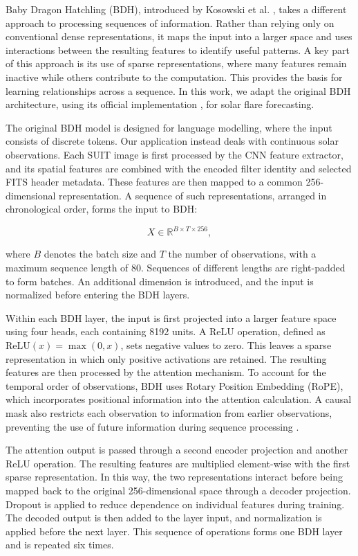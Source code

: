 \documentclass[oneside]{ieeeaccess}
\begin{document}
Baby Dragon Hatchling (BDH), introduced by Kosowski et al. 
\cite{ref3}, takes a different approach to processing 
sequences of information. Rather than relying only on 
conventional dense representations, it maps the input into 
a larger space and uses interactions between the resulting 
features to identify useful patterns. A key part of this 
approach is its use of sparse representations, where many 
features remain inactive while others contribute to the 
computation. This provides the basis for learning 
relationships across a sequence. In this work, we adapt 
the original BDH architecture, using its official 
implementation \cite{ref14}, for solar flare forecasting.

The original BDH model is designed for language modelling, 
where the input consists of discrete tokens. Our application 
instead deals with continuous solar observations. Each SUIT 
image is first processed by the CNN feature extractor, 
and its spatial features are combined with the encoded 
filter identity and selected FITS header metadata. These 
features are then mapped to a common 256-dimensional 
representation. A sequence of such representations, 
arranged in chronological order, forms the input to BDH:

\begin{equation}
    X \in \mathbb{R}^{B \times T \times 256},
\end{equation}

where $B$ denotes the batch size and $T$ the number of 
observations, with a maximum sequence length of 80. 
Sequences of different lengths are right-padded to form 
batches. An additional dimension is introduced, and 
the input is normalized before entering the BDH layers.

Within each BDH layer, the input is first projected into 
a larger feature space using four heads, each containing 
8192 units. A ReLU operation, defined as 
$\mathrm{ReLU}(x)=\max(0,x)$, sets negative values to 
zero. This leaves a sparse representation in which only 
positive activations are retained. The resulting features 
are then processed by the attention mechanism. To account 
for the temporal order of observations, BDH uses Rotary 
Position Embedding (RoPE), which incorporates positional 
information into the attention calculation. A causal mask 
also restricts each observation to information from 
earlier observations, preventing the use of future 
information during sequence processing \cite{ref14}.

The attention output is passed through a second encoder 
projection and another ReLU operation. The resulting 
features are multiplied element-wise with the first 
sparse representation. In this way, the two representations 
interact before being mapped back to the original 
256-dimensional space through a decoder projection. 
Dropout is applied to reduce dependence on individual 
features during training. The decoded output is then 
added to the layer input, and normalization is applied 
before the next layer. This sequence of operations forms 
one BDH layer and is repeated six times.
\end{document}
